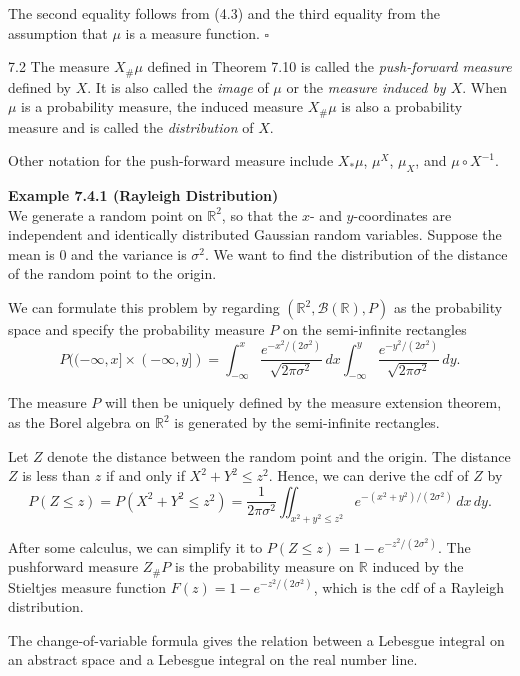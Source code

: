 The second equality follows from (4.3) and the third equality from the assumption that $\mu$ is a measure function. \hfill $\square$

\begin{defbox}{7.2}
The measure $X_{\#}\mu$ defined in Theorem 7.10 is called the \textit{push-forward measure} defined by $X$. It is also called the \textit{image} of $\mu$ or the \textit{measure induced by $X$}. When $\mu$ is a probability measure, the induced measure $X_{\#}\mu$ is also a probability measure and is called the \textit{distribution} of $X$.

Other notation for the push-forward measure include $X_{*}\mu$, $\mu^X$, $\mu_X$, and $\mu\circ X^{-1}$.
\end{defbox}

\textbf{Example 7.4.1 (Rayleigh Distribution)} \\
We generate a random point on $\mathbb{R}^2$, so that the $x$- and $y$-coordinates are independent and identically distributed Gaussian random variables. Suppose the mean is 0 and the variance is $\sigma^2$. We want to find the distribution of the distance of the random point to the origin.

We can formulate this problem by regarding $(\mathbb{R}^2,\mathcal{B}(\mathbb{R}),P)$ as the probability space and specify the probability measure $P$ on the semi-infinite rectangles
\[
P((-\infty,x]\times (-\infty,y])
=
\int_{-\infty}^{x} \frac{e^{-x^2/(2\sigma^2)}}{\sqrt{2\pi\sigma^2}}\, dx
\int_{-\infty}^{y} \frac{e^{-y^2/(2\sigma^2)}}{\sqrt{2\pi\sigma^2}}\, dy.
\]

The measure $P$ will then be uniquely defined by the measure extension theorem, as the Borel algebra on $\mathbb{R}^2$ is generated by the semi-infinite rectangles.

Let $Z$ denote the distance between the random point and the origin. The distance $Z$ is less than $z$ if and only if $X^2+Y^2\le z^2$. Hence, we can derive the cdf of $Z$ by
\[
P(Z\le z)
=
P(X^2+Y^2\le z^2)
=
\frac{1}{2\pi\sigma^2}
\iint_{x^2+y^2\le z^2}
e^{-(x^2+y^2)/(2\sigma^2)}\, dx\, dy.
\]

After some calculus, we can simplify it to $P(Z\le z)=1-e^{-z^2/(2\sigma^2)}$. The pushforward measure $Z_{\#}P$ is the probability measure on $\mathbb{R}$ induced by the Stieltjes measure function $F(z)=1-e^{-z^2/(2\sigma^2)}$, which is the cdf of a Rayleigh distribution.

The change-of-variable formula gives the relation between a Lebesgue integral on an abstract space and a Lebesgue integral on the real number line.

